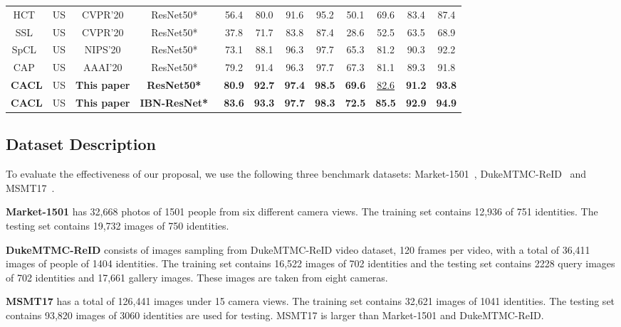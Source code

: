 \documentclass[journal]{IEEEtran}
\begin{document}
\begin{table*}
\begin{center}
\begin{tabular}{|c|c|c|c|c|c|c|c|c|c|c|c|}
					HCT~\cite{Zeng:CVPR20}&US& CVPR'20&{ResNet50*~\cite{he:CVPR16resnet}} &56.4 &80.0 &91.6 &95.2 &50.1 &69.6 &83.4 &87.4\\
					SSL~\cite{Lin:CVPR20}&US& CVPR'20&{ResNet50*~\cite{he:CVPR16resnet}} &37.8 &71.7 &83.8 &87.4 &28.6 &52.5 &63.5 &68.9\\
					SpCL~\cite{Ge:NIPS20}&US&NIPS'20&{ResNet50*~\cite{he:CVPR16resnet}}& 73.1& 88.1 & 96.3 &97.7& 65.3&81.2& 90.3 &92.2\\
					CAP~\cite{Wang:AAAI20}&US&AAAI'20&{ResNet50*~\cite{he:CVPR16resnet}}& 79.2& 91.4 & 96.3 &97.7& 67.3&81.1& 89.3 &91.8\\
					\hline\hline
					{\bf CACL }& US & {\bf This paper}&{\bf ResNet50*~\cite{he:CVPR16resnet}}& {\bf80.9}&{\bf 92.7}& {\bf97.4 }&
					{\bf98.5}&{\bf69.6}&{\underline {82.6}}& {\bf91.2}& {\bf93.8} \\
					{\bf CACL }& US & {\bf This paper}&{\bf IBN-ResNet*~\cite{Pan:IBNResNet}}& {\bf83.6}&{\bf93.3}& {\bf97.7 }&
					{\bf98.3}&{\bf72.5}&{\bf{85.5}}& {\bf92.9}& {\bf94.9} \\
\hline
\end{tabular}
\end{center}
\label{tab:SOTA}
\end{table*}






\subsection{Dataset Description}
To evaluate the effectiveness of our proposal, we use the following three benchmark datasets: 
Market-1501~\cite{Zheng:ICCV15}, DukeMTMC-ReID~\cite{Ristani:Duke} and MSMT17~\cite{MSMT:18}. 

{\bf Market-1501} has 32,668 photos of 1501 people from six different camera views. The training set contains 12,936 of  751 identities. The testing set contains 19,732 images of 750 identities. 

{\bf DukeMTMC-ReID} consists of images sampling from DukeMTMC-ReID video dataset, 120 frames per video, with a total of 36,411 images of people of 1404  identities. The training set contains 16,522 images of 702 identities and the testing set contains 2228 query images of 702 identities and 17,661 gallery images. These images are taken from eight cameras. 


{\bf MSMT17} has a total of 126,441 images under 15 camera views. The training set contains 32,621 images of 1041 identities. The testing set contains 93,820 images of 3060 identities are used for testing. MSMT17 is larger than Market-1501 and DukeMTMC-ReID.  
\end{document}
